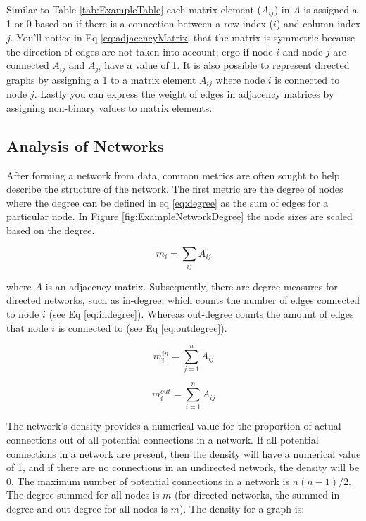 \noindent Similar to Table \ref{tab:ExampleTable} each matrix element (\(A_{ij}\)) in \(A\) is assigned a 1 or 0 based on if there is a connection between a row index (\(i\))  and column index \(j\). You'll notice in Eq \ref{eq:adjacencyMatrix} that the matrix is symmetric because 
the direction of edges are not taken into account; ergo if node \(i\) and node \(j\) are connected \(A_{ij}\) and \(A_{ji}\) have a value of 1. It is also possible to represent directed graphs by assigning a 1 to a matrix element \(A_{ij}\) where node \(i\) is connected to node \(j\). Lastly you can express the weight of edges in adjacency matrices by assigning non-binary values to matrix elements.

\subsection{Analysis of Networks}
After forming a network from data, common metrics are often sought to help describe the structure of the network.  The first metric are the degree of nodes where the degree  can be defined in eq \ref{eq:degree} as the sum of edges for a particular node. In Figure \ref{fig:ExampleNetworkDegree} the node sizes are scaled based on the degree.

\begin{equation}
    \label{eq:degree}
    m_i =  \sum_{ij}A_{ij}
\end{equation}

 \noindent where \(A\) is an adjacency matrix. Subsequently, there are degree measures for directed networks, such as in-degree, which counts the number of edges connected to node \(i\) (see Eq \ref{eq:indegree}). Whereas out-degree counts the amount of edges that node \(i\) is connected to (see Eq \ref{eq:outdegree}).

\begin{equation}
    \label{eq:indegree}
    m_i^{in} =  \sum_{j=1}^{n}A_{ij}
\end{equation}

\begin{equation}
    \label{eq:outdegree}
    m_i^{out} =  \sum_{i=1}^{n}A_{ij}
\end{equation}

\noindent The network's density provides a numerical value for the proportion of actual connections out of all potential connections in a network. If all potential connections in a network are present, then the density will have a numerical value of 1, and if there are no connections in an undirected network, the density will be 0. The maximum number of potential connections in a network is \(n(n-1)/2\).  The degree summed for all nodes is \(m\) (for directed networks, the summed in-degree and out-degree for all nodes is \(m\)). The density for a graph is:

